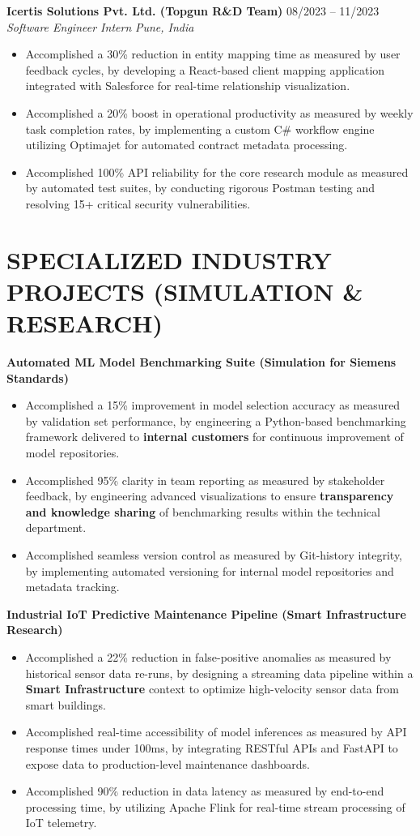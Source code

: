 \documentclass[10pt, a4paper]{article}
\newcommand{\experienceitem}[4]{
  \noindent \textbf{#1} \hfill #2 \\
  \textit{#3} \hfill \textit{#4}
}
\begin{document}
\experienceitem{Icertis Solutions Pvt. Ltd. (Topgun R\&D Team)}{08/2023 -- 11/2023}{Software Engineer Intern}{Pune, India}
\begin{itemize}
    \item Accomplished a 30\% reduction in entity mapping time as measured by user feedback cycles, by developing a React-based client mapping application integrated with Salesforce for real-time relationship visualization.
    \item Accomplished a 20\% boost in operational productivity as measured by weekly task completion rates, by implementing a custom C\# workflow engine utilizing Optimajet for automated contract metadata processing.
    \item Accomplished 100\% API reliability for the core research module as measured by automated test suites, by conducting rigorous Postman testing and resolving 15+ critical security vulnerabilities.
\end{itemize}

\section{SPECIALIZED INDUSTRY PROJECTS (SIMULATION \& RESEARCH)}

\textbf{Automated ML Model Benchmarking Suite (Simulation for Siemens Standards)} 
\begin{itemize}
    \item Accomplished a 15\% improvement in model selection accuracy as measured by validation set performance, by engineering a Python-based benchmarking framework delivered to \textbf{internal customers} for continuous improvement of model repositories.
    \item Accomplished 95\% clarity in team reporting as measured by stakeholder feedback, by engineering advanced visualizations to ensure \textbf{transparency and knowledge sharing} of benchmarking results within the technical department.
    \item Accomplished seamless version control as measured by Git-history integrity, by implementing automated versioning for internal model repositories and metadata tracking.
\end{itemize}

\textbf{Industrial IoT Predictive Maintenance Pipeline (Smart Infrastructure Research)} 
\begin{itemize}
    \item Accomplished a 22\% reduction in false-positive anomalies as measured by historical sensor data re-runs, by designing a streaming data pipeline within a \textbf{Smart Infrastructure} context to optimize high-velocity sensor data from smart buildings.
    \item Accomplished real-time accessibility of model inferences as measured by API response times under 100ms, by integrating RESTful APIs and FastAPI to expose data to production-level maintenance dashboards.
    \item Accomplished 90\% reduction in data latency as measured by end-to-end processing time, by utilizing Apache Flink for real-time stream processing of IoT telemetry.
\end{itemize}
\end{document}
